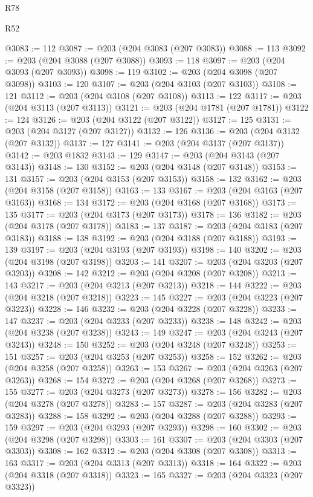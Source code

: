 \begin{lexlean}{R78}
\begin{lexlean}{R52}
\begin{coremodule}
{{{{{{{{{{{{{{{{{{{{{{{{{{{{{{{{{{{{{{{{{{{{{{{{{{{{{{{{{{{{{{{{{{{{{{{{{{{{{{{{{{{{{{{{{{{{{{{{{{{{{{{{{{{{{{{{{{{{{{{{{{{{{{{{{{{{{{{{{{{{{{{{{{{{{{{{{{{{{{{{{{{{{{{{{{{{{{{{{{{{{{{{{{{{{{{{{{{{{{@3083 := 112
@3087 := @203 (@204 @3083 (@207 @3083))
@3088 := 113
@3092 := @203 (@204 @3088 (@207 @3088))
@3093 := 118
@3097 := @203 (@204 @3093 (@207 @3093))
@3098 := 119
@3102 := @203 (@204 @3098 (@207 @3098))
@3103 := 120
@3107 := @203 (@204 @3103 (@207 @3103))
@3108 := 121
@3112 := @203 (@204 @3108 (@207 @3108))
@3113 := 122
@3117 := @203 (@204 @3113 (@207 @3113))
@3121 := @203 (@204 @1781 (@207 @1781))
@3122 := 124
@3126 := @203 (@204 @3122 (@207 @3122))
@3127 := 125
@3131 := @203 (@204 @3127 (@207 @3127))
@3132 := 126
@3136 := @203 (@204 @3132 (@207 @3132))
@3137 := 127
@3141 := @203 (@204 @3137 (@207 @3137))
@3142 := @203 @1832
@3143 := 129
@3147 := @203 (@204 @3143 (@207 @3143))
@3148 := 130
@3152 := @203 (@204 @3148 (@207 @3148))
@3153 := 131
@3157 := @203 (@204 @3153 (@207 @3153))
@3158 := 132
@3162 := @203 (@204 @3158 (@207 @3158))
@3163 := 133
@3167 := @203 (@204 @3163 (@207 @3163))
@3168 := 134
@3172 := @203 (@204 @3168 (@207 @3168))
@3173 := 135
@3177 := @203 (@204 @3173 (@207 @3173))
@3178 := 136
@3182 := @203 (@204 @3178 (@207 @3178))
@3183 := 137
@3187 := @203 (@204 @3183 (@207 @3183))
@3188 := 138
@3192 := @203 (@204 @3188 (@207 @3188))
@3193 := 139
@3197 := @203 (@204 @3193 (@207 @3193))
@3198 := 140
@3202 := @203 (@204 @3198 (@207 @3198))
@3203 := 141
@3207 := @203 (@204 @3203 (@207 @3203))
@3208 := 142
@3212 := @203 (@204 @3208 (@207 @3208))
@3213 := 143
@3217 := @203 (@204 @3213 (@207 @3213))
@3218 := 144
@3222 := @203 (@204 @3218 (@207 @3218))
@3223 := 145
@3227 := @203 (@204 @3223 (@207 @3223))
@3228 := 146
@3232 := @203 (@204 @3228 (@207 @3228))
@3233 := 147
@3237 := @203 (@204 @3233 (@207 @3233))
@3238 := 148
@3242 := @203 (@204 @3238 (@207 @3238))
@3243 := 149
@3247 := @203 (@204 @3243 (@207 @3243))
@3248 := 150
@3252 := @203 (@204 @3248 (@207 @3248))
@3253 := 151
@3257 := @203 (@204 @3253 (@207 @3253))
@3258 := 152
@3262 := @203 (@204 @3258 (@207 @3258))
@3263 := 153
@3267 := @203 (@204 @3263 (@207 @3263))
@3268 := 154
@3272 := @203 (@204 @3268 (@207 @3268))
@3273 := 155
@3277 := @203 (@204 @3273 (@207 @3273))
@3278 := 156
@3282 := @203 (@204 @3278 (@207 @3278))
@3283 := 157
@3287 := @203 (@204 @3283 (@207 @3283))
@3288 := 158
@3292 := @203 (@204 @3288 (@207 @3288))
@3293 := 159
@3297 := @203 (@204 @3293 (@207 @3293))
@3298 := 160
@3302 := @203 (@204 @3298 (@207 @3298))
@3303 := 161
@3307 := @203 (@204 @3303 (@207 @3303))
@3308 := 162
@3312 := @203 (@204 @3308 (@207 @3308))
@3313 := 163
@3317 := @203 (@204 @3313 (@207 @3313))
@3318 := 164
@3322 := @203 (@204 @3318 (@207 @3318))
@3323 := 165
@3327 := @203 (@204 @3323 (@207 @3323))
}}}}}}}}}}}}}}}}}}}}}}}}}}}}}}}}}}}}}}}}}}}}}}}}}}}}}}}}}}}}}}}}}}}}}}}}}}}}}}}}}}}}}}}}}}}}}}}}}}}}}}}}}}}}}}}}}}}}}}}}}}}}}}}}}}}}}}}}}}}}}}}}}}}}}}}}}}}}}}}}}}}}}}}}}}}}}}}}}}}}}}}}}}}}}}}}}}}}}}
\end{coremodule}
\end{lexlean}
\end{lexlean}
